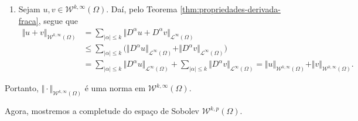 \documentclass[a4paper, 11pt]{book}
\theoremstyle{definition}
\newcommand{\cL}{\mathcal{L}}
\newcommand{\cW}{\mathcal{W}}
\begin{document}
\begin{prf}
\begin{enumerate}[leftmargin=*]
        \item Sejam $u, v \in \cW^{k,\infty}(\Omega)$. Daí, pelo Teorema \ref{thm:propriedades-derivada-fraca}, segue que
        \[
            \begin{aligned}
                \Vert u + v \Vert_{\cW^{k,\infty}(\Omega)} &= \sum_{|\alpha| \leqslant k} \Vert D^\alpha u + D^\alpha v \Vert_{\cL^\infty(\Omega)}\\ &\leqslant \sum_{|\alpha| \leqslant k} \Big( \Vert D^\alpha u \Vert_{\cL^\infty(\Omega)} + \Vert D^\alpha v \Vert_{\cL^\infty(\Omega)} \Big)\\
                &= \sum_{|\alpha| \leqslant k} \Vert D^\alpha u \Vert_{\cL^\infty(\Omega)} + \sum_{|\alpha| \leqslant k}\Vert D^\alpha v \Vert_{\cL^\infty(\Omega)} = \Vert u \Vert_{\cW^{k,\infty}(\Omega)} + \Vert v \Vert_{\cW^{k,\infty}(\Omega)}.
            \end{aligned}
        \]
    \end{enumerate}
    Portanto, $\Vert \cdot \Vert_{\cW^{k,\infty}(\Omega)}$ é uma norma em $\cW^{k,\infty}(\Omega)$.
\end{prf}

Agora, mostremos a completude do espaço de Sobolev $\cW^{k,p}(\Omega)$.
\end{document}
